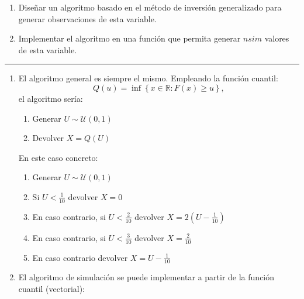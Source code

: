 \documentclass[
  10pt,
]{book}
\theoremstyle{break}
\theoremstyle{nonumberplain}
\begin{document}
\begin{enumerate}
\def\labelenumi{\alph{enumi})}
\item
  Diseñar un algoritmo basado en el método de inversión generalizado
  para generar observaciones de esta variable.
\item
  Implementar el algoritmo en una función que permita generar \(nsim\)
  valores de esta variable.
\end{enumerate}

\begin{center}\rule{0.5\linewidth}{0.5pt}\end{center}

\begin{enumerate}
\def\labelenumi{\alph{enumi})}
\item
  El algoritmo general es siempre el mismo. Empleando la función cuantil:
  \[Q\left( u\right) = \inf \left\{ x\in \mathbb{R}:F\left( x\right) 
  \geq u\right\},\]
  el algoritmo sería:

  \begin{enumerate}
  \def\labelenumii{\arabic{enumii}.}
  \item
    Generar \(U\sim \mathcal{U}\left( 0,1\right)\)
  \item
    Devolver \(X=Q\left( U\right)\)
  \end{enumerate}

  En este caso concreto:

  \begin{enumerate}
  \def\labelenumii{\arabic{enumii}.}
  \item
    Generar \(U\sim \mathcal{U}\left( 0,1\right)\)
  \item
    Si \(U < \frac{1}{10}\) devolver \(X = 0\)
  \item
    En caso contrario, si \(U < \frac{2}{10}\) devolver \(X = 2(U - \frac{1}{10})\)
  \item
    En caso contrario, si \(U < \frac{3}{10}\) devolver \(X = \frac{2}{10}\)
  \item
    En caso contrario devolver \(X = U - \frac{1}{10}\)
  \end{enumerate}
\item
  El algoritmo de simulación se puede implementar a partir de la función cuantil
  (vectorial):


\end{enumerate}
\end{document}
